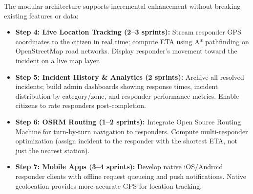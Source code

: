 The modular architecture supports incremental enhancement without breaking existing features or data:

\begin{itemize}
  \item \textbf{Step 4: Live Location Tracking (2–3 sprints):} Stream responder GPS coordinates to the citizen in real time; compute ETA using A* pathfinding on OpenStreetMap road networks. Display responder's movement toward the incident on a live map layer.

  \item \textbf{Step 5: Incident History \& Analytics (2 sprints):} Archive all resolved incidents; build admin dashboards showing response times, incident distribution by category/zone, and responder performance metrics. Enable citizens to rate responders post-completion.

  \item \textbf{Step 6: OSRM Routing (1–2 sprints):} Integrate Open Source Routing Machine for turn-by-turn navigation to responders. Compute multi-responder optimization (assign incident to the responder with the shortest ETA, not just the nearest station).

  \item \textbf{Step 7: Mobile Apps (3–4 sprints):} Develop native iOS/Android responder clients with offline request queueing and push notifications. Native geolocation provides more accurate GPS for location tracking.
\end{itemize}
